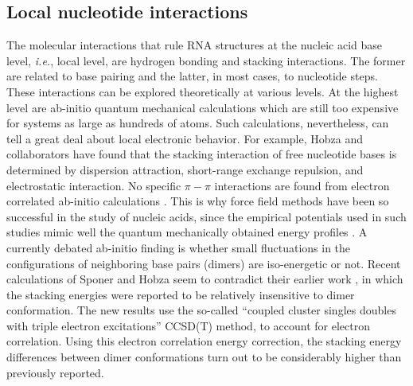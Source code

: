 \subsection{Local nucleotide interactions}
The molecular  interactions that  rule  RNA structures at  the nucleic
acid base level, \textit{i.e.},  local level, are hydrogen bonding and
stacking interactions. The former are  related to base pairing and the
latter, in most cases, to  nucleotide steps. These interactions can be
explored  theoretically at various  levels. At  the highest  level are
ab-initio  quantum   mechanical  calculations  which   are  still  too
expensive   for  systems  as   large  as   hundreds  of   atoms.  Such
calculations,  nevertheless,  can  tell   a  great  deal  about  local
electronic behavior.  For example, Hobza and  collaborators have found
that the  stacking interaction of free nucleotide  bases is determined
by   dispersion  attraction,   short-range  exchange   repulsion,  and
electrostatic  interaction.  No  specific $\pi-\pi$  interactions  are
found     from    electron    correlated     ab-initio    calculations
\cite{sponer1996, sponer1997}.  This is  why force field  methods have
been so successful in the  study of nucleic acids, since the empirical
potentials used  in such studies  mimic well the  quantum mechanically
obtained energy profiles \cite{tung2004, sponer2000}.
A currently debated ab-initio finding is whether small fluctuations in
the   configurations   of   neighboring   base  pairs   (dimers)   are
iso-energetic  or  not.   Recent  calculations  of  Sponer  and  Hobza
\cite{sponer2006}    seem   to    contradict   their    earlier   work
\cite{sponer2000,  hobza2002},  in which  the  stacking energies  were
reported to  be relatively insensitive to dimer  conformation. The new
results  use  the so-called  ``coupled  cluster  singles doubles  with
triple electron excitations'' CCSD(T)  method, to account for electron
correlation.  Using  this electron correlation  energy correction, the
stacking energy differences between dimer conformations turn out to be
considerably higher than previously reported.

